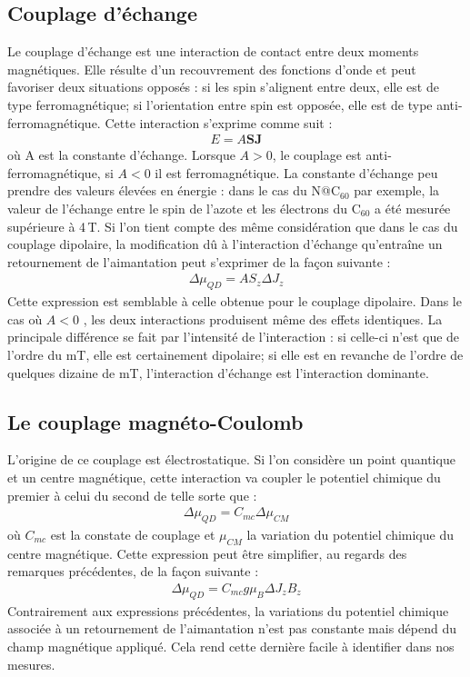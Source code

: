 \subsection{Couplage d'échange}
Le couplage d'échange est une interaction de contact entre deux moments magnétiques. Elle résulte d'un recouvrement des fonctions d'onde et peut favoriser deux situations opposés : si les spin s'alignent entre deux, elle est de type ferromagnétique; si l'orientation entre spin est opposée, elle est de type anti-ferromagnétique. Cette interaction s'exprime comme suit :
\begin{eqnarray}
E = A\mathbf{SJ} \nonumber
\end{eqnarray}
où A est la constante d'échange. Lorsque $A>0$, le couplage est anti-ferromagnétique, si $A<0$ il est ferromagnétique. La constante d'échange peu prendre des valeurs élevées en énergie : dans le cas du N@C$_{60}$ par exemple, la valeur de l'échange entre le spin de l'azote et les électrons du C$_{60}$ a été mesurée supérieure à 4\,T. Si l'on tient compte des même considération que dans le cas du couplage dipolaire, la modification d\^u à l'interaction d'échange qu’entraîne un retournement de l'aimantation peut s'exprimer de la façon suivante :
\begin{eqnarray}
\Delta \mu_{QD} = AS_z\Delta J_z\nonumber
\end{eqnarray}
Cette expression est semblable à celle obtenue pour le couplage dipolaire. Dans le cas où $A<0$ , les deux interactions produisent même des effets identiques. La principale différence se fait par l'intensité de l'interaction : si celle-ci n'est que de l'ordre du mT, elle est certainement dipolaire; si elle est en revanche de l'ordre de quelques dizaine de mT, l'interaction d'échange est l'interaction dominante.

\subsection{Le couplage magnéto-Coulomb}
L'origine de ce couplage est électrostatique. Si l'on considère un point quantique et un centre magnétique, cette interaction va coupler le potentiel chimique du premier à celui du second de telle sorte que :
\begin{eqnarray}
\Delta \mu_{QD} = C_{mc} \Delta \mu_{CM}
\end{eqnarray}
où $C_{mc}$ est la constate de couplage et $\mu_{CM}$ la variation du potentiel chimique du centre magnétique. Cette expression peut être simplifier, au regards des remarques précédentes, de la façon suivante :
\begin{eqnarray}
\Delta \mu_{QD} = C_{mc} g \mu_B  \Delta J_z B_z
\end{eqnarray}
Contrairement aux expressions précédentes, la variations du potentiel chimique associée à un retournement de l'aimantation n'est pas constante mais dépend du champ magnétique appliqué. Cela rend cette dernière facile à identifier dans nos mesures.

